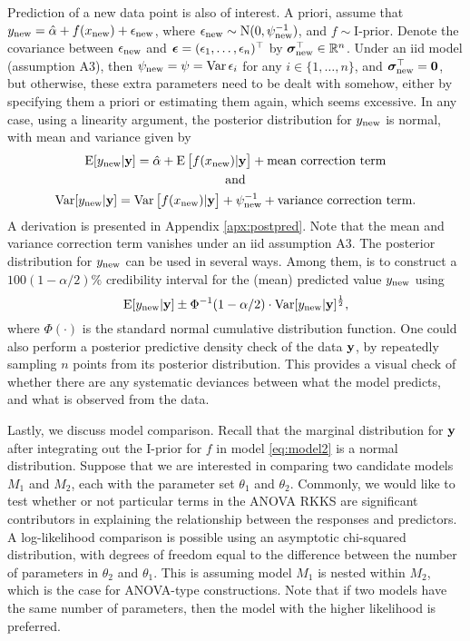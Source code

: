 Prediction of a new data point is also of interest.
A priori, assume that $y_{\text{new}} = \hat\alpha + f(x_{\text{new}}) + \epsilon_{\text{new}}$, where $\epsilon_{\text{new}} \sim \operatorname{N}(0,\psi^{-1}_{\text{new}})$, and $f\sim \text{I-prior}$.
Denote the covariance between $\epsilon_{\text{new}}$ and ${\bm\epsilon} = (\epsilon_1,\dots,\epsilon_n)^\top$ by ${\bm\sigma}_{\text{new}}^\top \in \mathbb{R}^n$.
Under an iid model (assumption A3), then $\psi_{\text{new}} = \psi = \operatorname{Var} \epsilon_i$ for any $i\in\{1,\dots,n\}$, and ${\bm\sigma}_{\text{new}}^\top={\mathbf 0}$, but otherwise, these extra parameters need to be dealt with somehow, either by specifying them a priori or estimating them again, which seems excessive.
In any case, using a linearity argument, the posterior distribution for $y_{\text{new}}$ is normal, with mean and variance given by
\begin{gather}
  \operatorname{E}[y_{\text{new}}|{\mathbf y}] = \hat\alpha + \operatorname{E} \big[ f(x_{\text{new}}) |{\mathbf y} \big] + \text{mean correction term} \\
  \text{and} \nonumber \\
  \operatorname{Var}[y_{\text{new}}|{\mathbf y}] 
  = \operatorname{Var}\big[f(x_{\text{new}})|{\mathbf y}\big] + \psi^{-1}_{\text{new}} + \text{variance correction term}.
\end{gather}
A derivation is presented in Appendix \ref{apx:postpred}.
Note that the mean and variance correction term vanishes under an iid assumption A3.
The posterior distribution for $y_{\text{new}}$ can be used in several ways. 
Among them, is to construct a $100(1 - \alpha/2)\%$ credibility interval for the (mean) predicted value $y_{\text{new}}$ using
\[
  \operatorname{E}[y_{\text{new}}|{\mathbf y}] \pm \Phi^{-1}(1 - \alpha/2) \cdot \operatorname{Var}[y_{\text{new}}|{\mathbf y}]^{\frac{1}{2}},
\]
where $\Phi(\cdot)$ is the standard normal cumulative distribution function.
One could also perform a posterior predictive density check of the data ${\mathbf y}$, by repeatedly sampling $n$ points from its posterior distribution.
This provides a visual check of whether there are any systematic deviances between what the model predicts, and what is observed from the data.

Lastly, we discuss model comparison.
Recall that the marginal distribution for ${\mathbf y}$ after integrating out the I-prior for $f$ in model \eqref{eq:model2} is a normal distribution.
Suppose that we are interested in comparing two candidate models $M_1$ and $M_2$, each with the parameter set $\theta_1$ and $\theta_2$.
Commonly, we would like to test whether or not particular terms in the ANOVA RKKS are significant contributors in explaining the relationship between the responses and predictors.
A log-likelihood comparison is possible using an asymptotic chi-squared distribution, with degrees of freedom equal to the difference between the number of parameters in $\theta_2$ and $\theta_1$.
This is assuming model $M_1$ is nested within $M_2$, which is the case for ANOVA-type constructions.
Note that if two models have the same number of parameters, then the model with the higher likelihood is preferred.

